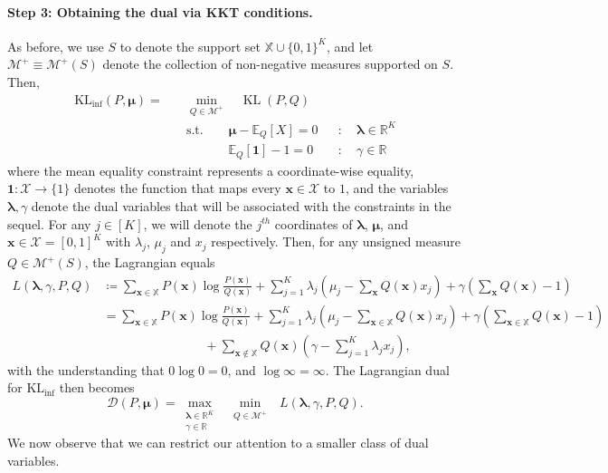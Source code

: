 \documentclass{article}
\theoremstyle{plain}
\theoremstyle{definition}
\newcommand{\lrp}[1]{\left( #1 \right)}
\newcommand{\lrs}[1]{\left[ #1 \right]}
\newcommand{\KLinf}{\operatorname{KL_{inf}}}
\newcommand{\KL}{\operatorname{KL}}
\newcommand{\Exp}[2]{\mathbb{E}_{#1}\lrs{#2}}
\newcommand{\R}{\mathbb{R}}
\newcommand{\calX}{\mathcal X}
\newcommand{\calM}{\mathcal M}
\newcommand{\xvec}{\mathbf{x}}
\newcommand{\boldlambda}{\boldsymbol{\lambda}}
\newcommand{\boldmu}{\boldsymbol{\mu}}
\newcommand{\finitesupport}{\mathbb{X}}
\begin{document}
\paragraph{Step 3: Obtaining the dual via KKT conditions.} 
As before, we use  $S$ to denote the support set $\finitesupport \cup \{0, 1\}^K$, and let $\calM^+ \equiv \calM^+(S)$ denote the collection of non-negative measures supported  on $S$. Then,  
\begin{align}
    \KLinf(P,\boldmu) = \quad &\min\limits_{Q\in \mathcal M^+} \quad \KL(P,Q) \\ 
    & \text{s.t.} \qquad \boldmu - \Exp{Q}{X} = 0  &&:\quad \boldlambda \in \R^K \\
    & \text{~~~~} \qquad \Exp{Q}{\boldsymbol{1}} - 1 = 0 \ &&:\quad \gamma \in \R
\end{align}
where the mean equality constraint represents a coordinate-wise equality, $\boldsymbol{1}:\calX \to \{1\}$ denotes the function that maps every $\xvec\in \calX$ to $1$,  and the variables $\boldlambda, \gamma$ denote the dual variables that will be associated with the constraints in the sequel. For any $j \in [K]$, we will denote the $j^{th}$ coordinates of $\boldlambda$, $\boldmu$, and $\xvec \in \calX= [0,1]^K$ with $\lambda_j$, $\mu_j$ and $x_j$ respectively. Then, for any unsigned measure $Q\in \calM^+(S)$, the Lagrangian equals
\begin{align}
    L({\bm\lambda}, \gamma, P, Q) &\coloneqq  \sum\limits_{\xvec \in\finitesupport} P(\xvec)\log\frac{P(\xvec)}{Q(\xvec)} + \sum\limits_{j=1}^K \lambda_j\lrp{ \mu_j - \sum\limits_{\xvec} Q(\xvec) x_j  } + \gamma \lrp{ \sum_{\xvec} Q(\xvec) - 1 }\\
    &= \sum\limits_{\xvec \in\finitesupport} P(\xvec )\log\frac{P(\xvec)}{Q(\xvec)} + \sum\limits_{j=1}^K \lambda_j\lrp{ \mu_j - \sum\limits_{\xvec \in\finitesupport} Q(\xvec ) x_j  } + \gamma \lrp{ \sum_{\xvec \in\finitesupport} Q(\xvec) - 1 } \\
    &\qquad\qquad\qquad\qquad +  \sum\limits_{\xvec \notin\finitesupport} Q(\xvec) \lrp{ \gamma  - \sum\limits_{j=1}^K \lambda_j  x_j  },
\end{align}
with the understanding that $0\log 0 = 0$, and $\log \infty = \infty$.
The Lagrangian dual for $\KLinf$ then becomes 
\[ \mathcal D(P, \boldmu) = \max\limits_{\substack{\boldlambda \in \R^K \\ \gamma \in \R}} ~~ \min\limits_{\substack{Q\in \mathcal M^+}} ~~
 L({\bm \lambda}, \gamma, P,Q).\]
We now observe that we can restrict our attention to a smaller class of dual variables. 
\end{document}
